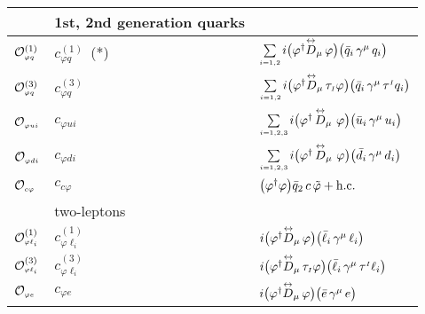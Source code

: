\begin{table}[htbp]
\begin{center}
\begin{tabular}{lll}
                \midrule \midrule
		&1st, 2nd generation quarks&\\
                \midrule \midrule
    $\mathcal{O}_{\scriptscriptstyle \varphi q}^{(1)}$ & $c_{\varphi q}^{(1)}$~(*) & $\sum\limits_{\scriptscriptstyle i=1,2} i\big(\varphi^\dagger\overset{\text{\scriptsize$\leftrightarrow$}}{D}_\mu\,\varphi\big)
 \big(\bar{q}_i\,\gamma^\mu\,q_i\big)$ \\\hline
    $\mathcal{O}_{\scriptscriptstyle \varphi q}^{(3)}$ & $c_{\varphi q}^{(3)}$ & $\sum\limits_{\scriptscriptstyle i=1,2} i\big(\varphi^\dagger\overset{\text{\scriptsize$\leftrightarrow$}}{D}_\mu\,\tau_{\scriptscriptstyle I}\varphi\big)
 \big(\bar{q}_i\,\gamma^\mu\,\tau^{\scriptscriptstyle I}q_i\big)$ \\  \hline
  ${\mathcal{O}_{\scriptscriptstyle \varphi u i}}$ &
      ${{c_{\varphi u i}}}$ & $\sum\limits_{\scriptscriptstyle i=1,2,3} i\big(\varphi^\dagger\,\overset{\text{\scriptsize$\leftrightarrow$}}{D}_\mu\,\,\varphi\big)
 \big(\bar{u}_i\,\gamma^\mu\,u_i\big)$\\ \hline
 ${\mathcal{O}_{\scriptscriptstyle \varphi d i}}$ &
      ${{c_{\varphi d i}}}$ & $\sum\limits_{\scriptscriptstyle i=1,2,3} i\big(\varphi^\dagger\,\overset{\text{\scriptsize$\leftrightarrow$}}{D}_\mu\,\,\varphi\big)
 \big(\bar{d}_i\,\gamma^\mu\,d_i\big)$\\ \hline
    $\mathcal{O}_{\scriptscriptstyle c \varphi}$ & $c_{c \varphi}$ & $\left(\pdp\right)
 \bar{q}_2\,c\,\tilde\varphi + \text{h.c.}$ \\
                \midrule \midrule
		&two-leptons&\\
                \midrule \midrule
    $\mathcal{O}_{\scriptscriptstyle \varphi \ell_i}^{(1)}$ & $c_{\varphi \ell_i}^{(1)}$ & $ i\big(\varphi^\dagger\overset{\text{\scriptsize$\leftrightarrow$}}{D}_\mu\,\varphi\big)
   \big(\bar{\ell}_i\,\gamma^\mu\,\ell_i\big)$ \\\hline 
    $\mathcal{O}_{\scriptscriptstyle \varphi \ell_i}^{(3)}$ & $c_{\varphi \ell_i}^{(3)}$ & $ i\big(\varphi^\dagger\overset{\text{\scriptsize$\leftrightarrow$}}{D}_\mu\,\tau_{\scriptscriptstyle I}\varphi\big)
 \big(\bar{\ell}_i\,\gamma^\mu\,\tau^{\scriptscriptstyle I}\ell_i\big)$ \\  \hline
    $\mathcal{O}_{\scriptscriptstyle \varphi e}$ & $c_{\varphi e}$ & $ i\big(\varphi^\dagger\overset{\text{\scriptsize$\leftrightarrow$}}{D}_\mu\,\varphi\big)
 \big(\bar{e}\,\gamma^\mu\,e\big)$ \\\hline

\end{tabular}
\end{center}
\end{table}
